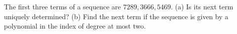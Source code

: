 The first three terms of a sequence are $7289,3666,5469$. (a) Is its next term uniquely determined? (b) Find the next term if the sequence is given by a polynomial in the index of degree at most two.
